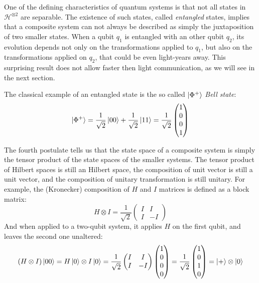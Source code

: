 \documentclass[10pt,a4paper, titlepage]{report}
\theoremstyle{definition}
\newcommand{\kz}{\ket{0}}
\newcommand{\kpl}{\ket{+}}
\newcommand{\oost}{\frac{1}{\sqrt{2}}}
\newcommand{\Hto}[1]{\mathcal{H}^{\otimes #1}}
\newcommand{\tensor}{\otimes}
\begin{document}
One of the defining characteristics of quantum systems is that not all states in $\Hto{2}$ are separable. The existence of such states, called \textit{entangled} states, implies that a composite system can not always be described as simply the juxtaposition of two smaller states. When a qubit $q_1$ is entangled with an other qubit $q_2$, its evolution depends not only on the transformations applied to $q_1$, but also on the transformations applied on $q_2$, that could be even light-years away. This surprising result does not allow faster then light communication, as we will see in the next section.

The classical example of an entangled state is the so called $\ket{\Phi^+}$ \textit{Bell state}:
\[\ket{\Phi^+} = \oost\ket{00} + \oost\ket{11} = \oost\begin{pmatrix}
1 \\ 0 \\ 0\\ 1
\end{pmatrix}
\]

The fourth postulate tells us that the state space of a composite system is simply the tensor product of the state spaces of the smaller systems. The tensor product of Hilbert spaces is still an Hilbert space, the composition of unit vector is still a unit vector, and the composition of unitary transformation is still unitary. For example, the (Kronecker) composition of $H$ and $I$ matrices is defined as a block matrix:
\[	H\tensor I = \oost\begin{pmatrix}
	I & I \\ I & -I
	\end{pmatrix}\]
And when applied to a two-qubit system, it applies $H$ on the first qubit, and leaves the second one unaltered:
\[ (H\tensor I) \ket{00} = H\kz \tensor I\kz = \oost \begin{pmatrix}
	I & I \\ I & -I
	\end{pmatrix} \begin{pmatrix}
	1 \\ 0 \\0 \\0
	\end{pmatrix} = \oost \begin{pmatrix}
	1 \\ 0 \\ 1 \\ 0
	\end{pmatrix} = \kpl\tensor\kz
\]
\end{document}
